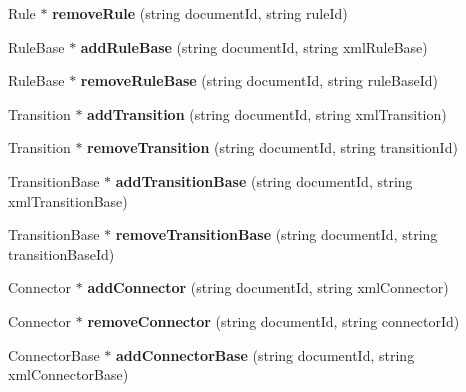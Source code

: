 \begin{CompactItemize}
\item 
Rule $\ast$ \textbf{removeRule} (string documentId, string ruleId)\label{classbr_1_1pucrio_1_1telemidia_1_1ginga_1_1ncl_1_1PrivateBaseContext_ec789db0e3bd130c406bcdccff22b00d}

\item 
RuleBase $\ast$ \textbf{addRuleBase} (string documentId, string xmlRuleBase)\label{classbr_1_1pucrio_1_1telemidia_1_1ginga_1_1ncl_1_1PrivateBaseContext_c65fd8bb92c284f5502069387e098ea6}

\item 
RuleBase $\ast$ \textbf{removeRuleBase} (string documentId, string ruleBaseId)\label{classbr_1_1pucrio_1_1telemidia_1_1ginga_1_1ncl_1_1PrivateBaseContext_9cf642a62b77554fd598b148c747da00}

\item 
Transition $\ast$ \textbf{addTransition} (string documentId, string xmlTransition)\label{classbr_1_1pucrio_1_1telemidia_1_1ginga_1_1ncl_1_1PrivateBaseContext_cf4331acb3a571be6153c6fe08e7d310}

\item 
Transition $\ast$ \textbf{removeTransition} (string documentId, string transitionId)\label{classbr_1_1pucrio_1_1telemidia_1_1ginga_1_1ncl_1_1PrivateBaseContext_7a85c7c0baab0711707c7e02d2f66cf5}

\item 
TransitionBase $\ast$ \textbf{addTransitionBase} (string documentId, string xmlTransitionBase)\label{classbr_1_1pucrio_1_1telemidia_1_1ginga_1_1ncl_1_1PrivateBaseContext_604b12ac877a8a71b5ff36b62af708aa}

\item 
TransitionBase $\ast$ \textbf{removeTransitionBase} (string documentId, string transitionBaseId)\label{classbr_1_1pucrio_1_1telemidia_1_1ginga_1_1ncl_1_1PrivateBaseContext_3bde27cae28f25bba665051caf477ab9}

\item 
Connector $\ast$ \textbf{addConnector} (string documentId, string xmlConnector)\label{classbr_1_1pucrio_1_1telemidia_1_1ginga_1_1ncl_1_1PrivateBaseContext_0129d574f8a1cfd4d2763ecb02daa0d7}

\item 
Connector $\ast$ \textbf{removeConnector} (string documentId, string connectorId)\label{classbr_1_1pucrio_1_1telemidia_1_1ginga_1_1ncl_1_1PrivateBaseContext_1af2765cc40affc56a032cb8ee3013bf}

\item 
ConnectorBase $\ast$ \textbf{addConnectorBase} (string documentId, string xmlConnectorBase)\label{classbr_1_1pucrio_1_1telemidia_1_1ginga_1_1ncl_1_1PrivateBaseContext_ae24f2e152451189e758150de62fa12a}


\end{CompactItemize}

